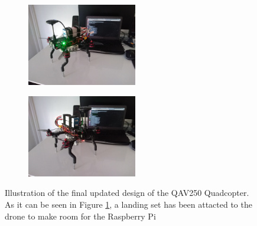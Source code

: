\documentclass[../Head/report.tex]{subfiles}
\begin{document}
\begin{figure}[H]
    \centering
    \begin{subfigure}[b]{.33\textwidth}
        \centering
        \includegraphics[height=3.6cm]{../Figures/drone/drone_front.jpg}
        \caption{}
        \label{fig:drone_front}
    \end{subfigure}
    \begin{subfigure}[b]{.33\textwidth}
        \centering
        \includegraphics[height=3.6cm]{../Figures/drone/drone_front2.jpg}
        \caption{}
        \label{fig:drone_bottom_zoom}
    \end{subfigure}
    \caption{Illustration of the final updated design of the QAV250 Quadcopter. As it can be seen in Figure \ref{fig:drone_front}, a landing set has been attacted to the drone to make room for the Raspberry Pi}
    \label{fig:drone}
\end{figure}
\end{document}
